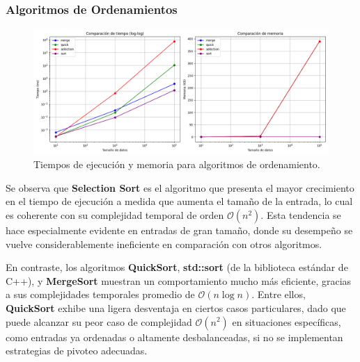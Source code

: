 \subsubsection{Algoritmos de Ordenamientos}
\begin{figure}[H]
    \centering
    \includegraphics[width=\textwidth]{../code/sorting/data/plots/scaling_comparison.png}
    \caption{Tiempos de ejecución y memoria para algoritmos de ordenamiento.}
\end{figure}
Se observa que \textbf{Selection Sort} es el algoritmo que presenta el mayor crecimiento en el tiempo de ejecución a medida que aumenta el tamaño de la entrada, lo cual es coherente con su complejidad temporal de orden $\mathcal{O}(n^2)$. Esta tendencia se hace especialmente evidente en entradas de gran tamaño, donde su desempeño se vuelve considerablemente ineficiente en comparación con otros algoritmos.

En contraste, los algoritmos \textbf{QuickSort}, \textbf{std::sort} (de la biblioteca estándar de C++), y \textbf{MergeSort} muestran un comportamiento mucho más eficiente, gracias a sus complejidades temporales promedio de $\mathcal{O}(n \log n)$. Entre ellos, \textbf{QuickSort} exhibe una ligera desventaja en ciertos casos particulares, dado que puede alcanzar su peor caso de complejidad $\mathcal{O}(n^2)$ en situaciones específicas, como entradas ya ordenadas o altamente desbalanceadas, si no se implementan estrategias de pivoteo adecuadas.

